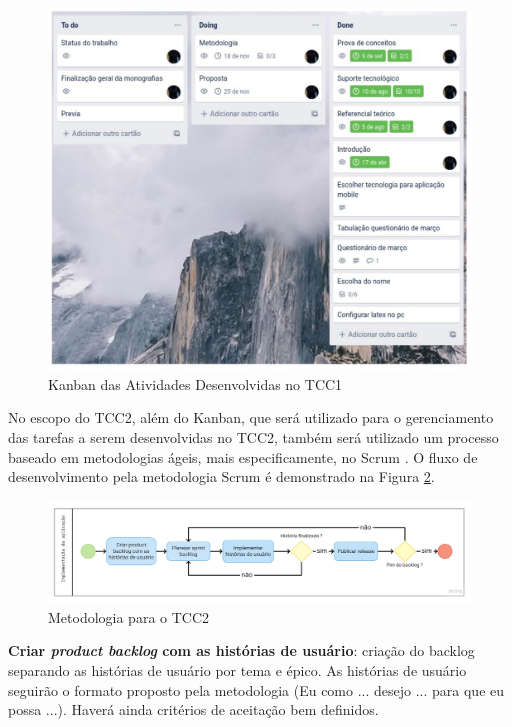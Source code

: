 \begin{figure}[ht]
	\centering
	\includegraphics[keepaspectratio=true,scale=0.6]{figuras/kanban.pdf}
	\caption{Kanban das Atividades Desenvolvidas no TCC1 }
        \label{fig04}
\end{figure}

No escopo do TCC2, além do Kanban, que será utilizado para o gerenciamento das tarefas a serem desenvolvidas no TCC2,
também será utilizado um processo baseado em metodologias ágeis, mais especificamente, no Scrum \cite{scrum2017}. O fluxo de desenvolvimento 
pela metodologia Scrum é demonstrado na Figura \ref{fig05}.


\begin{figure}[ht]
	\centering
	\includegraphics[keepaspectratio=true,scale=0.29]{figuras/scrummet.pdf}
	\caption{Metodologia para o TCC2}
        \label{fig05}
\end{figure}

\textbf{Criar \emph{product backlog} com as histórias de usuário}: criação do backlog separando as histórias de usuário por tema e épico. As histórias de usuário seguirão 
o formato proposto pela metodologia (Eu como ... desejo ... para que eu possa ...). Haverá ainda critérios de aceitação bem definidos. 

